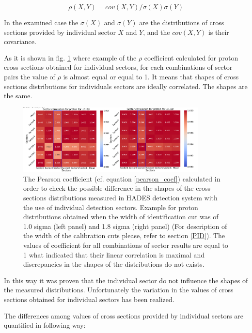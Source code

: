 \begin{equation}
\label{pearson_coef}
\rho(X,Y) = cov(X,Y) / \sigma(X)\sigma(Y)    
\end{equation}

In the examined case the $\sigma(X)$ and $\sigma(Y)$ are the 
distributions of cross sections provided by individual sector $X$ and $Y$, and the $cov(X,Y)$ is their  covariance.  
 
As it is shown in fig. \ref{pearson_proton} where example of the $\rho$ coefficient calculated for proton cross sections obtained for individual sectors, for each combinations of sector pairs the value of $\rho$ is almost equal or equal to 1. It means that shapes of cross sections distributions for individuals sectors are ideally correlated. The shapes are  the same.   

\begin{figure}
    \centering
    \includegraphics[width=0.85\textwidth]{images/pearson_1.png}%
    \caption{The Pearson coefficient (cf. equation \ref{pearson_coef}) calculated in order to check the possible difference in the shapes of the cross sections distributions measured in HADES detection system with the use of individual detection sectors. Example for proton distributions obtained when the width of identification cut was of 1.0 sigma (left panel) and 1.8 sigma (right panel) (For description of the width of the calibration cuts please, refer to section \ref{PID}).
    The values of coefficient for all combinations of sector results are equal to  1 what indicated that their linear correlation is maximal and discrepancies 
    in the shapes of the distributions do not exists.}
    \label{pearson_proton}
\end{figure}

In this way it was proven that the individual sector do not influence the shapes of the measured distributions. Unfortunately  
the variation in the values of cross sections obtained for individual sectors has been realized. 

The differences among values of cross sections provided by individual sectors are quantified in following way:

